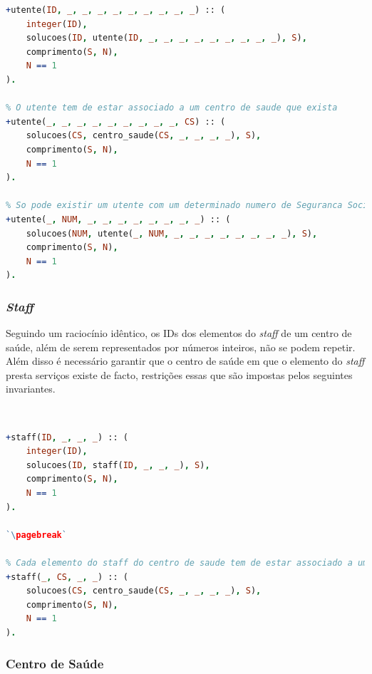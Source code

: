 \documentclass[a4paper, 11pt]{article}
\begin{document}
\begin{lstlisting}[language=Prolog, caption={Invariantes de inserção relativos ao predicado \texttt{utente}}]
% O ID do utente deve ser um numero inteiro e deve ser unico
+utente(ID, _, _, _, _, _, _, _, _, _) :: (
    integer(ID),
    solucoes(ID, utente(ID, _, _, _, _, _, _, _, _, _), S),
    comprimento(S, N),
    N == 1
).

% O utente tem de estar associado a um centro de saude que exista
+utente(_, _, _, _, _, _, _, _, _, CS) :: (
    solucoes(CS, centro_saude(CS, _, _, _, _), S),
    comprimento(S, N),
    N == 1
).

% So pode existir um utente com um determinado numero de Seguranca Social
+utente(_, NUM, _, _, _, _, _, _, _, _) :: (
    solucoes(NUM, utente(_, NUM, _, _, _, _, _, _, _, _), S),
    comprimento(S, N),
    N == 1
).
\end{lstlisting}


\subsubsection*{\textit{Staff}}

Seguindo um raciocínio idêntico, os IDs dos elementos do \textit{staff} de um centro de saúde, além de serem representados
por números inteiros, não se podem repetir. Além disso é necessário garantir que o centro de saúde em que o elemento do
\textit{staff} presta serviços existe de facto, restrições essas que são impostas pelos seguintes invariantes.

\

\begin{lstlisting}[language=Prolog, caption={Invariantes de inserção relativos ao predicado \texttt{staff}}]
% O ID de cada elemento do staff do centro de saude deve ser um numero inteiro e deve ser unico
+staff(ID, _, _, _) :: (
    integer(ID),
    solucoes(ID, staff(ID, _, _, _), S),
    comprimento(S, N),
    N == 1
).

`\pagebreak`

% Cada elemento do staff do centro de saude tem de estar associado a um centro de saude que exista
+staff(_, CS, _, _) :: (
    solucoes(CS, centro_saude(CS, _, _, _, _), S),
    comprimento(S, N),
    N == 1
).
\end{lstlisting}

\subsubsection*{Centro de Saúde}
\end{document}
